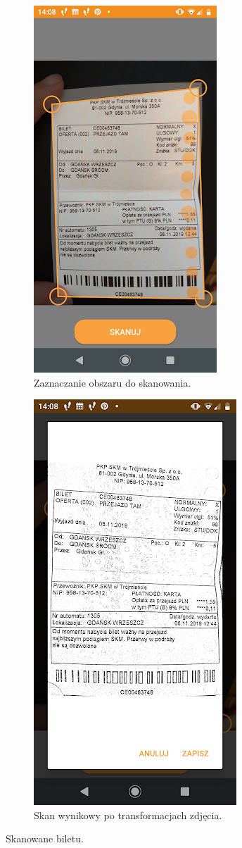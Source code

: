 \documentclass[10pt,twoside,a4paper]{report}
\begin{document}
\begin{figure}[h]
\begin{subfigure}{0.5\textwidth}
\centering
\includegraphics[width=0.9\linewidth, width=5cm]{scan1}
\caption{Zaznaczanie obszaru do skanowania.}
\label{fig:scan1}
\end{subfigure}
\begin{subfigure}{0.5\textwidth}
\centering
\includegraphics[width=0.9\linewidth, width=5cm]{scan2}
\caption{Skan wynikowy po transformacjach zdjęcia.}
\label{fig:scan2}
\end{subfigure}
\caption{Skanowane biletu.}
\label{fig:Eimage}
\end{figure}
\end{document}
